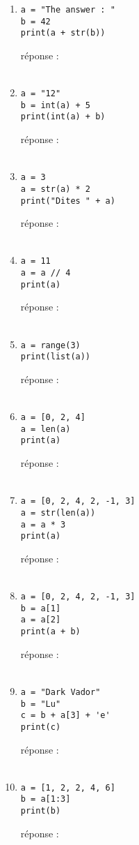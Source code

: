 \documentclass[12pt,a4paper]{article}
\newcommand{\response}{réponse : \hrulefill\\\\}
\begin{document}
\begin{enumerate}
\item
\begin{lstlisting}
a = "The answer : "
b = 42
print(a + str(b))
\end{lstlisting}
\response %
\pagebreak

\item
\begin{lstlisting}
a = "12"
b = int(a) + 5
print(int(a) + b)
\end{lstlisting}
\response %

\item
\begin{lstlisting}
a = 3
a = str(a) * 2
print("Dites " + a)
\end{lstlisting}
\response %

\item
\begin{lstlisting}
a = 11
a = a // 4
print(a)
\end{lstlisting}
\response %

\item
\begin{lstlisting}
a = range(3) 
print(list(a))
\end{lstlisting}
\response %

\item
\begin{lstlisting}
a = [0, 2, 4]
a = len(a)
print(a) 
\end{lstlisting}
\response %
\pagebreak

\item
\begin{lstlisting}
a = [0, 2, 4, 2, -1, 3]
a = str(len(a))
a = a * 3
print(a) 
\end{lstlisting}
\response %

\item
\begin{lstlisting}
a = [0, 2, 4, 2, -1, 3]
b = a[1]
a = a[2] 
print(a + b) 
\end{lstlisting}
\response %

\item
\begin{lstlisting}
a = "Dark Vador"
b = "Lu"
c = b + a[3] + 'e' 
print(c) 
\end{lstlisting}
\response %

\item
\begin{lstlisting}
a = [1, 2, 2, 4, 6]
b = a[1:3]
print(b) 
\end{lstlisting}
\response %


\end{enumerate}
\end{document}
